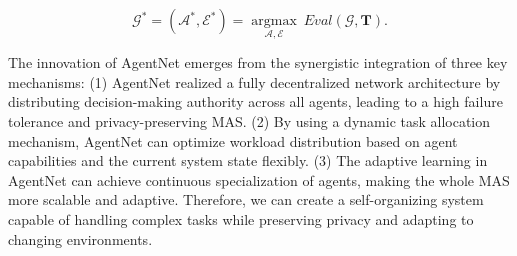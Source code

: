\documentclass{article}
\begin{document}
\begin{equation}
    \mathcal{G^*} = (\boldsymbol{\mathcal{A^*}}, \boldsymbol{\mathcal{E^*}}) = \mathop{\arg\max}\limits_{\boldsymbol{\mathcal{A}}, \boldsymbol{\mathcal{E}}}\ Eval(\mathcal{G}, \boldsymbol{T}).
\end{equation}

The innovation of AgentNet emerges from the synergistic integration of three key mechanisms: (1) AgentNet realized a fully decentralized network architecture by distributing decision-making authority across all agents, leading to a high failure tolerance and privacy-preserving MAS. (2) By using a dynamic task allocation mechanism, AgentNet can optimize workload distribution based on agent capabilities and the current system state flexibly. (3) The adaptive learning in AgentNet can achieve continuous specialization of agents, making the whole MAS more scalable and adaptive. Therefore, we can create a self-organizing system capable of handling complex tasks while preserving privacy and adapting to changing environments.




    
    
        
        
\end{document}
